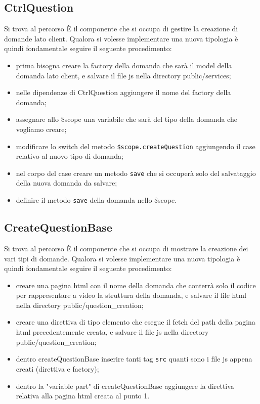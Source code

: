 \documentclass[a4paper, titlepage]{article}
\begin{document}
	\subsection{CtrlQuestion}
	Si trova al percorso  
	È il componente che si occupa di gestire la creazione di domande lato client.
	Qualora si volesse implementare una nuova tipologia è quindi fondamentale seguire il seguente procedimento:
	\begin{itemize}
		\item prima bisogna creare la factory della domanda che sarà il model della domanda lato client, e salvare il file js nella directory public/services;
		\item nelle dipendenze di CtrlQuestion aggiungere il nome del factory della domanda;
		\item assegnare allo \$scope una variabile che sarà del tipo della domanda che vogliamo creare;
		\item modificare lo switch del metodo \texttt{\$scope.createQuestion} aggiungendo il case relativo al nuovo tipo di domanda;
		\item nel corpo del case creare un metodo \texttt{save} che si occuperà solo del salvataggio della nuova domanda da salvare;
		\item definire il metodo \texttt{save} della domanda nello \$scope.
	\end{itemize}
	
	\subsection{CreateQuestionBase}
	Si trova al percorso 
	È il componente che si occupa di mostrare la creazione dei vari tipi di domande.
	Qualora si volesse implementare una nuova tipologia è quindi fondamentale seguire il seguente procedimento:
	\begin{itemize}
		\item creare una pagina html con il nome della domanda che conterrà solo il codice per rappresentare a video la struttura della domanda, e salvare il file html nella directory public/question\_creation;
		\item creare una direttiva  di tipo elemento che esegue il fetch del path della pagina html precedentemente creata, e salvare il file js nella directory public/question\_creation;
		\item dentro createQuestionBase inserire tanti tag \texttt{src} quanti sono i file js appena creati (direttiva e factory);
		\item dentro la "variable part" di createQuestionBase aggiungere la direttiva relativa alla pagina html creata al punto 1.
	\end{itemize}
	
\end{document}
